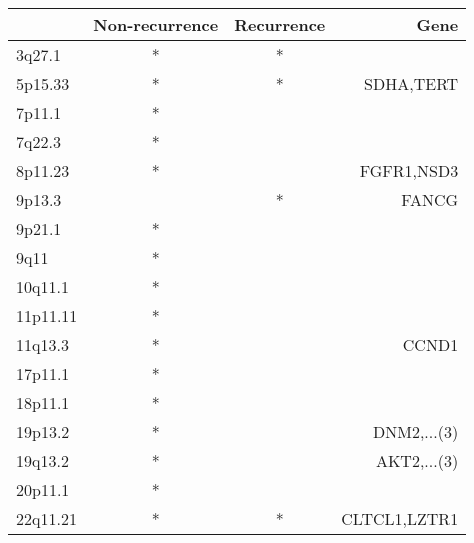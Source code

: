 \begin{tabular}{lccr}
\toprule
{} & Non-recurrence & Recurrence &          Gene \\
\midrule
3q27.1   &              * &          * &               \\
5p15.33  &              * &          * &     SDHA,TERT \\
7p11.1   &              * &            &               \\
7q22.3   &              * &            &               \\
8p11.23  &              * &            &    FGFR1,NSD3 \\
9p13.3   &                &          * &         FANCG \\
9p21.1   &              * &            &               \\
9q11     &              * &            &               \\
10q11.1  &              * &            &               \\
11p11.11 &              * &            &               \\
11q13.3  &              * &            &         CCND1 \\
17p11.1  &              * &            &               \\
18p11.1  &              * &            &               \\
19p13.2  &              * &            &   DNM2,...(3) \\
19q13.2  &              * &            &   AKT2,...(3) \\
20p11.1  &              * &            &               \\
22q11.21 &              * &          * &  CLTCL1,LZTR1 \\
\bottomrule
\end{tabular}
